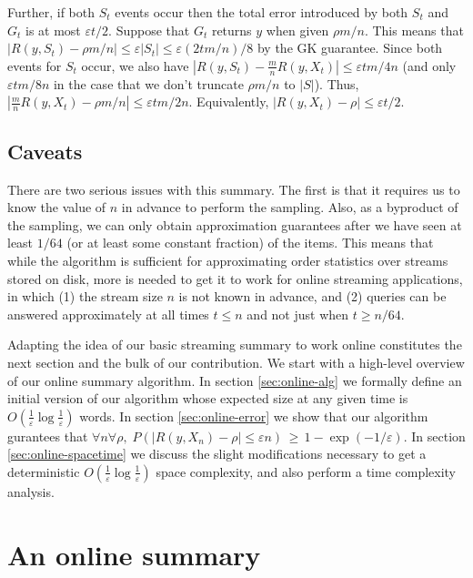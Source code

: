 \documentclass{article}
\theoremstyle{plain}
\def\ep{\varepsilon}
\newcommand{\p}[1]{(#1)}
\newcommand{\abs}[1]{|#1|}
\newcommand{\expp}[1]{\exp\p{#1}}
\renewcommand{\P}[1]{P\p{#1}}
\newcommand{\OO}[1]{O\p{#1}}
\newcommand{\rank}[2]{R\p{#1,#2}}
\begin{document}
Further, if both $S_t$ events occur then the total error introduced by both
$S_t$ and $G_t$ is at most $\ep t / 2$. Suppose that $G_t$ returns $y$ when
given $\rho m / n$. This means that $\abs{\rank{y}{S_t} - \rho m / n} \le \ep
\abs{S_t} \le \ep \p{2 t m / n} / 8$ by the GK guarantee. Since both events for
$S_t$ occur, we also have $\abs{\rank{y}{S_t} - \frac{m}{n} \rank{y}{X_t}} \le
\ep t m / 4 n$ (and only $\ep t m / 8 n$ in the case that we don't truncate
$\rho m / n$ to $\abs{S}$). Thus, $\abs{\frac{m}{n} \rank{y}{X_t} - \rho m / n}
\le \ep t m / 2 n$. Equivalently, $\abs{\rank{y}{X_t} - \rho} \le \ep t / 2$.



\subsection{Caveats}

There are two serious issues with this summary. The first is that it requires us
to know the value of $n$ in advance to perform the sampling. Also, as a
byproduct of the sampling, we can only obtain approximation guarantees after we
have seen at least $1/64$ (or at least some constant fraction) of the items.
This means that while the algorithm is sufficient for approximating order
statistics over streams stored on disk, more is needed to get it to work for
online streaming applications, in which (1) the stream size $n$ is not known in
advance, and (2) queries can be answered approximately at all times $t \le n$
and not just when $t \ge n/64$.

Adapting the idea of our basic streaming summary to work online constitutes the
next section and the bulk of our contribution.
We start with a high-level overview of our online summary algorithm.
In section \ref{sec:online-alg} we formally define an initial version of our
algorithm whose expected size at any given time is $\OO{\frac{1}{\ep} \log
  \frac{1}{\ep}}$ words.
In section \ref{sec:online-error} we show that our algorithm gurantees that
$\forall n \forall \rho,\; \P{\abs{\rank{y}{X_n} - \rho} \le \ep n} \,\ge\, 1 -
\expp{-1/\ep}$.
In section \ref{sec:online-spacetime} we discuss the slight modifications
necessary to get a deterministic $\OO{\frac{1}{\ep} \log \frac{1}{\ep}}$ space
complexity, and also perform a time complexity analysis.
 
\section{An online summary}
\label{sec:online}
\end{document}
